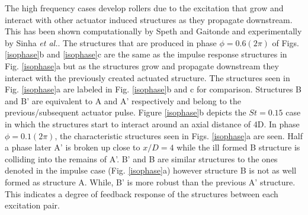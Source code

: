 \documentclass[english]{aiaa-tc}
\begin{document}
The high frequency cases develop rollers due to the excitation that grow and interact with other actuator induced structures as they propagate downstream. This has been shown computationally by Speth and Gaitonde\cite{spethASME2013} and experimentally by Sinha {\em et al.}\cite{sinha2013}. The structures that are produced in phase $\phi=0.6(2\pi)$ of Figs. \ref{isophase}b and \ref{isophase}c are the same as the impulse response structures in Fig. \ref{isophase}a but as the structures grow and propagate downstream they interact with the previously created actuated structure. The structures seen in Fig. \ref{isophase}a are labeled in Fig. \ref{isophase}b and c for comparison. Structures B and B' are equivalent to A and A' respectively and belong to the previous/subsequent actuator pulse. 
Figure \ref{isophase}b depicts the $St=0.15$ case in which the structures start to interact around an axial distance of 4D. In phase $\phi=0.1(2\pi)$, the characteristic structures seen in Figs. \ref{isophase}a are seen. Half a phase later A' is broken up close to $x/D=4$ while the ill formed B structure is colliding into the remains of A'. B' and B are similar structures to the ones denoted in the impulse case (Fig. \ref{isophase}a) however structure B is not as well formed as structure A. While, B' is more robust than the previous A' structure. This indicates a degree of feedback response of the structures between each excitation pair.
\end{document}
